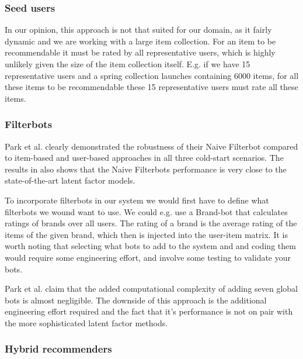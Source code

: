 \subsubsection{Seed users}

In our opinion, this approach is not that suited for our domain, as it fairly
dynamic and we are working with a large item collection. For an item to be
recommendable it must be rated by all representative users, which is highly
unlikely given the size of the item collection itself. E.g. if we have 15
representative users and a spring collection launches containing 6000 items,
for all these items to be recommendable these 15 representative users must rate
all these items.

\subsubsection{Filterbots}

Park et al. \cite{Park2006} clearly demonstrated the robustness of their Naive
Filterbot compared to item-based and user-based approaches in all three
cold-start scenarios. The results in \cite{Agarwal2009, Agarwal2010} also shows
that the Naive Filterbots performance is very close to the state-of-the-art
latent factor models.

To incorporate filterbots in our system we would first have to define what
filterbots we wound want to use. We could e.g. use a Brand-bot that calculates
ratings of brands over all users. The rating of a brand is the average rating
of the items of the given brand, which then is injected into the user-item
matrix. It is worth noting that selecting what bots to add to the system and
and coding them would require some engineering effort, and involve some testing
to validate your bots.

Park et al. \cite{Park2006} claim that the added computational complexity of
adding seven global bots is almost negligible. The downside of this approach is
the additional engineering effort required and the fact that it's performance
is not on pair with the more sophisticated latent factor methods.

\subsubsection{Hybrid recommenders}


